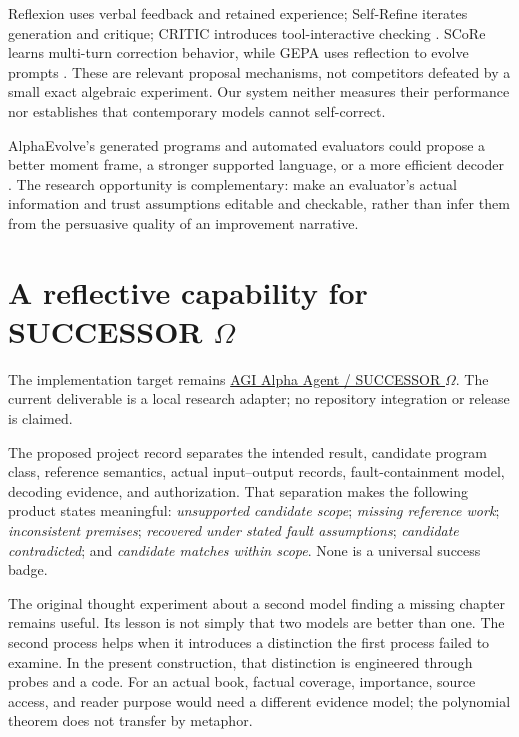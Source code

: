 \documentclass[11pt,letterpaper]{article}
\theoremstyle{remark}\newtheorem{remark}{Remark}[section]
\begin{document}
Reflexion uses verbal feedback and retained experience; Self-Refine iterates generation and critique; CRITIC introduces tool-interactive checking \citep{reflexion,selfrefine,critic}. SCoRe learns multi-turn correction behavior, while GEPA uses reflection to evolve prompts \citep{score,gepa}. These are relevant proposal mechanisms, not competitors defeated by a small exact algebraic experiment. Our system neither measures their performance nor establishes that contemporary models cannot self-correct.

AlphaEvolve's generated programs and automated evaluators could propose a better moment frame, a stronger supported language, or a more efficient decoder \citep{alphaevolve}. The research opportunity is complementary: make an evaluator's actual information and trust assumptions editable and checkable, rather than infer them from the persuasive quality of an improvement narrative.

\section{A reflective capability for SUCCESSOR \texorpdfstring{$\Omega$}{Omega}}
\label{sec:successor_system}
The implementation target remains \href{https://github.com/MontrealAI/AGI-Alpha-Agent-v0}{AGI Alpha Agent / SUCCESSOR $\Omega$}. The current deliverable is a local research adapter; no repository integration or release is claimed.

The proposed project record separates the intended result, candidate program class, reference semantics, actual input--output records, fault-containment model, decoding evidence, and authorization. That separation makes the following product states meaningful: \emph{unsupported candidate scope}; \emph{missing reference work}; \emph{inconsistent premises}; \emph{recovered under stated fault assumptions}; \emph{candidate contradicted}; and \emph{candidate matches within scope}. None is a universal success badge.

The original thought experiment about a second model finding a missing chapter remains useful. Its lesson is not simply that two models are better than one. The second process helps when it introduces a distinction the first process failed to examine. In the present construction, that distinction is engineered through probes and a code. For an actual book, factual coverage, importance, source access, and reader purpose would need a different evidence model; the polynomial theorem does not transfer by metaphor.
\end{document}
